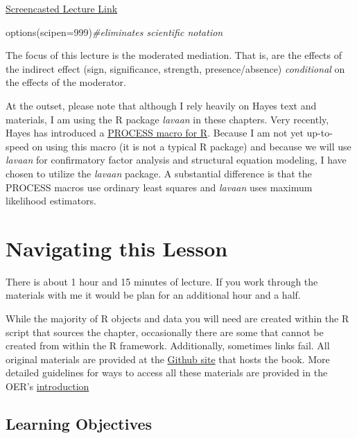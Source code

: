 \documentclass[
  11pt,
]{book}
\newenvironment{Shaded}{\begin{snugshade}}{\end{snugshade}}
\newcommand{\AttributeTok}[1]{\textcolor[rgb]{0.77,0.63,0.00}{#1}}
\newcommand{\CommentTok}[1]{\textcolor[rgb]{0.56,0.35,0.01}{\textit{#1}}}
\newcommand{\DecValTok}[1]{\textcolor[rgb]{0.00,0.00,0.81}{#1}}
\newcommand{\FunctionTok}[1]{\textcolor[rgb]{0.00,0.00,0.00}{#1}}
\newcommand{\NormalTok}[1]{#1}
\begin{document}
\href{https://spu.hosted.panopto.com/Panopto/Pages/Viewer.aspx?pid=1d28d076-efad-4471-b52d-ad1601826f92}{Screencasted Lecture Link}

\begin{Shaded}
\begin{Highlighting}[]
\FunctionTok{options}\NormalTok{(}\AttributeTok{scipen=}\DecValTok{999}\NormalTok{)}\CommentTok{\#eliminates scientific notation}
\end{Highlighting}
\end{Shaded}

The focus of this lecture is the moderated mediation. That is, are the effects of the indirect effect (sign, significance, strength, presence/absence) \emph{conditional} on the effects of the moderator.

At the outset, please note that although I rely heavily on Hayes \citeyearpar{hayes_introduction_2018} text and materials, I am using the R package \emph{lavaan} in these chapters. Very recently, Hayes has introduced a \href{https://www.processmacro.org/index.html}{PROCESS macro for R}. Because I am not yet up-to-speed on using this macro (it is not a typical R package) and because we will use \emph{lavaan} for confirmatory factor analysis and structural equation modeling, I have chosen to utilize the \emph{lavaan} package. A substantial difference is that the PROCESS macros use ordinary least squares and \emph{lavaan} uses maximum likelihood estimators.

\hypertarget{navigating-this-lesson-7}{%
\section{Navigating this Lesson}\label{navigating-this-lesson-7}}

There is about 1 hour and 15 minutes of lecture. If you work through the materials with me it would be plan for an additional hour and a half.

While the majority of R objects and data you will need are created within the R script that sources the chapter, occasionally there are some that cannot be created from within the R framework. Additionally, sometimes links fail. All original materials are provided at the \href{https://https://github.com/lhbikos/ReC_MultivModel}{Github site} that hosts the book. More detailed guidelines for ways to access all these materials are provided in the OER's \protect\hyperlink{ReCintro}{introduction}

\hypertarget{learning-objectives-7}{%
\subsection{Learning Objectives}\label{learning-objectives-7}}
\end{document}
